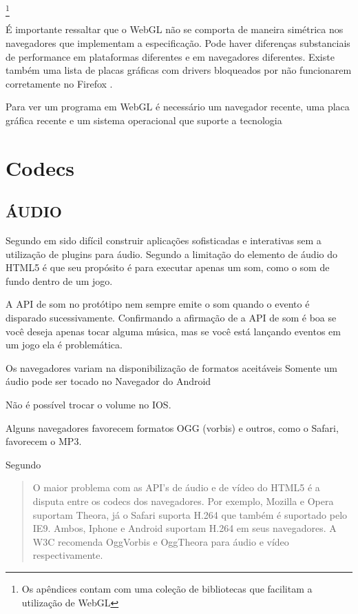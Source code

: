 \begin{draft}
\footnote{Os apêndices contam com uma coleção de bibliotecas que facilitam a utilização de WebGL}

É importante ressaltar que o WebGL não se comporta de maneira
simétrica nos navegadores que implementam a especificação. Pode haver
diferenças substanciais de performance em plataformas diferentes e em
navegadores diferentes. Existe também uma lista de placas gráficas
com drivers bloqueados por não funcionarem corretamente no Firefox
\autocite[pp.42]{3daps}.

Para ver um programa em WebGL é necessário um navegador recente, uma
placa gráfica recente e um sistema operacional que suporte a tecnologia
\autocite{html5mostwanted}

\section{Codecs}

\subsection{ÁUDIO}

Segundo \cite{browserGamesTechnologyAndFuture} em sido difícil
construir aplicações sofisticadas e interativas sem a utilização de
plugins para áudio.
Segundo \cite{html5mostwanted} a limitação do elemento de áudio do
HTML5 é que seu propósito é para executar apenas um som, como o som
de fundo dentro de um jogo.

A API de som no protótipo nem sempre emite o som quando o
evento é disparado sucessivamente. Confirmando a afirmação de
\cite{html5mostwanted} a API de som é boa se você deseja apenas tocar
alguma música, mas se você está lançando eventos em um jogo ela é
problemática.

Os navegadores variam na disponibilização de formatos aceitáveis
Somente um áudio pode ser tocado no Navegador do Android

Não é possível trocar o volume no IOS.

Alguns navegadores favorecem formatos OGG (vorbis) e outros, como o
Safari, favorecem o MP3.

Segundo \cite{html5Tradeoffs}
\begin{quote}
O maior problema com as API's de áudio e de vídeo do HTML5 é
a disputa entre os codecs dos navegadores. Por exemplo, Mozilla e
Opera suportam Theora, já o Safari suporta H.264 que também é
suportado pelo IE9. Ambos, Iphone e Android suportam H.264 em seus
navegadores. A W3C recomenda OggVorbis e OggTheora para áudio e vídeo
respectivamente.
\end{quote}


\end{draft}

